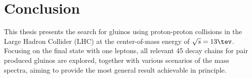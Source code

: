 \chapter{Conclusion} \label{sec::Conclusion}
%
%
This thesis presents the search for gluinos using proton-proton collisions in the Large Hadron Collider (LHC) at the center-of-mass energy of $\sqrt{s}=13\tev$. Focusing on the final state with one leptons, all relevant 45 decay chains for pair produced gluinos are explored, together with various scenarios of the mass spectra, aiming to provide the most general result achievable in principle. \\

